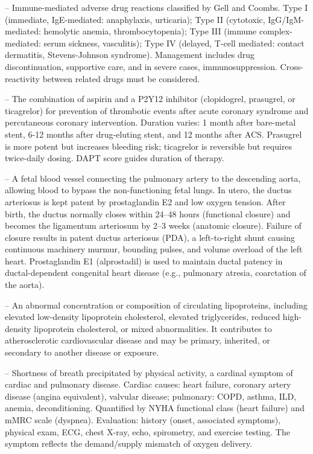 -- Immune-mediated adverse drug reactions classified by Gell and Coombs. Type I (immediate, IgE-mediated: anaphylaxis, urticaria); Type II (cytotoxic, IgG/IgM-mediated: hemolytic anemia, thrombocytopenia); Type III (immune complex-mediated: serum sickness, vasculitis); Type IV (delayed, T-cell mediated: contact dermatitis, Stevens-Johnson syndrome). Management includes drug discontinuation, supportive care, and in severe cases, immunosuppression. Cross-reactivity between related drugs must be considered.

-- The combination of aspirin and a P2Y12 inhibitor (clopidogrel, prasugrel, or ticagrelor) for prevention of thrombotic events after acute coronary syndrome and percutaneous coronary intervention. Duration varies: 1 month after bare-metal stent, 6-12 months after drug-eluting stent, and 12 months after ACS. Prasugrel is more potent but increases bleeding risk; ticagrelor is reversible but requires twice-daily dosing. DAPT score guides duration of therapy.

-- A fetal blood vessel connecting the pulmonary artery to the descending aorta, allowing blood to bypass the non-functioning fetal lungs. In utero, the ductus arteriosus is kept patent by prostaglandin E2 and low oxygen tension. After birth, the ductus normally closes within 24--48 hours (functional closure) and becomes the ligamentum arteriosum by 2--3 weeks (anatomic closure). Failure of closure results in patent ductus arteriosus (PDA), a left-to-right shunt causing continuous machinery murmur, bounding pulses, and volume overload of the left heart. Prostaglandin E1 (alprostadil) is used to maintain ductal patency in ductal-dependent congenital heart disease (e.g., pulmonary atresia, coarctation of the aorta).

-- An abnormal concentration or composition of circulating lipoproteins, including elevated low-density lipoprotein cholesterol, elevated triglycerides, reduced high-density lipoprotein cholesterol, or mixed abnormalities. It contributes to atherosclerotic cardiovascular disease and may be primary, inherited, or secondary to another disease or exposure.

-- Shortness of breath precipitated by physical activity, a cardinal symptom of cardiac and pulmonary disease. Cardiac causes: heart failure, coronary artery disease (angina equivalent), valvular disease; pulmonary: COPD, asthma, ILD, anemia, deconditioning. Quantified by NYHA functional class (heart failure) and mMRC scale (dyspnea). Evaluation: history (onset, associated symptoms), physical exam, ECG, chest X-ray, echo, spirometry, and exercise testing. The symptom reflects the demand/supply mismatch of oxygen delivery.

